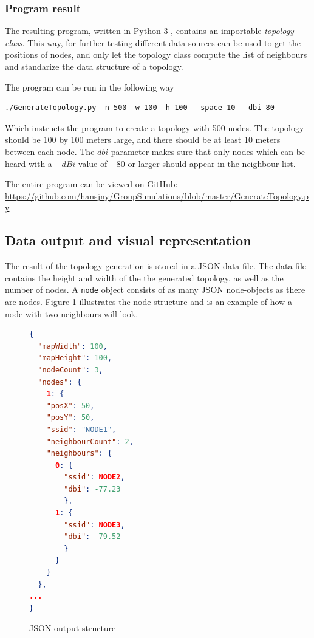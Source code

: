 	\subsubsection{Program result}
	The resulting program, written in Python 3 \cite{Python3}, contains an importable \textit{topology class}. This way, for further testing different data
	sources can be used to get the positions of nodes, and only let the topology class compute the list of neighbours and standarize the data structure of a topology.

The program can be run in the following way
\begin{verbatim}./GenerateTopology.py -n 500 -w 100 -h 100 --space 10 --dbi 80 \end{verbatim}
Which instructs the program to create a topology with 500 nodes. The topology should be 100 by 100 meters large, and there should be at least 10 meters
between each node. The $dbi$ parameter makes sure that only nodes which can be heard with a $-dBi$-value of $-80$ or larger should appear in the neighbour list. 

The entire program can be viewed on GitHub: \newline
{\small \url{https://github.com/hansjny/GroupSimulations/blob/master/GenerateTopology.py}}


\subsection{Data output and visual representation} \label{simulationrep}
The result of the topology generation is stored in a JSON \cite{JSON} data file.
The data file contains the height and width of the the generated topology, as well
as the number of nodes.
A \verb|node| object consists of as many JSON node-objects as there are nodes. Figure \ref{fig:nodeStruct} illustrates the node structure and is an example of how a node with two neighbours will look.
			\begin{figure}
			\begin{minipage}{\linewidth}
			\begin{lstlisting}[language=json]
{
  "mapWidth": 100,
  "mapHeight": 100,
  "nodeCount": 3,
  "nodes": {
    1: {
    "posX": 50,
    "posY": 50, 
    "ssid": "NODE1", 
    "neighbourCount": 2, 
    "neighbours": {
      0: {
        "ssid": NODE2,
        "dbi": -77.23
        },
      1: {
        "ssid": NODE3,
        "dbi": -79.52
        }
      }
    }
  },
...
}
\end{lstlisting}
\end{minipage}
\caption{JSON output structure}
\label{fig:nodeStruct}

\end{figure}

